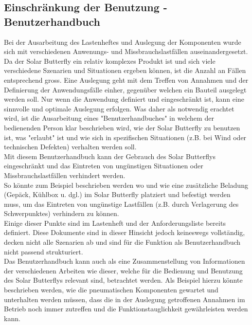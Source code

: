 
\subsection{Einschränkung der Benutzung - Benutzerhandbuch}
Bei der Ausarbeitung des Lastenheftes und Auslegung der Komponenten wurde sich mit verschiedenen Anwenungs- und Missbrauchslastfällen auseinandergesetzt. Da der Solar Butterfly ein relativ komplexes Produkt ist und sich viele verschiedene Szenarien und Situationen ergeben können, ist die Anzahl an Fällen entsprechend gross. Eine Auslegung geht mit dem Treffen von Annahmen und der Definierung der Anwendungsfälle einher, gegenüber welchen ein Bauteil ausgelegt werden soll. Nur wenn die Anwendung definiert und eingeschränkt ist, kann eine sinnvolle und optimale Auslegung erfolgen.
Was daher als notwendig erachtet wird, ist die Ausarbeitung eines "Benutzerhandbuches" in welchem der bedienenden Person klar beschrieben wird, wie der Solar Butterfly zu benutzen ist, was "erlaubt" ist und wie sich in spezifischen Situationen (z.B. bei Wind oder technischen Defekten) verhalten werden soll.\\
Mit diesem Benutzerhandbuch kann der Gebrauch des Solar Butterflys eingeschränkt und das Eintreten von ungünstigen Situationen oder Missbrauchslastfällen verhindert werden.\\
So könnte zum Beispiel beschrieben werden wo und wie eine zusätzliche Beladung (Gepäck, Kühlbox u. dgl.) im Solar Butterfly platziert und befestigt werden muss, um das Eintreten von ungünstige Lastfällen (z.B. durch Verlagerung des Schwerpunktes) verhindern zu können.\\
Einige dieser Punkte sind im Lastenheft und der Anforderungsliste bereits definiert. Diese Dokumente sind in dieser Hinsicht jedoch keineswegs  vollständig, decken nicht alle Szenarien ab und sind für die Funktion als Benutzerhandbuch nicht passend strukturiert.\\
Das Benutzerhandbuch kann auch als eine Zusammenstellung von Informationen der verschiedenen Arbeiten wie dieser, welche für die Bedienung und Benutzung des Solar Butterflys relevant sind, betrachtet werden.
Als Beispiel hierzu könnte beschrieben werden, wie die pneumatischen Komponenten gewartet und unterhalten werden müssen, dass die in der Auslegung getroffenen Annahmen im Betrieb noch immer zutreffen und die Funktionstauglichkeit gewährleisten werden kann.

